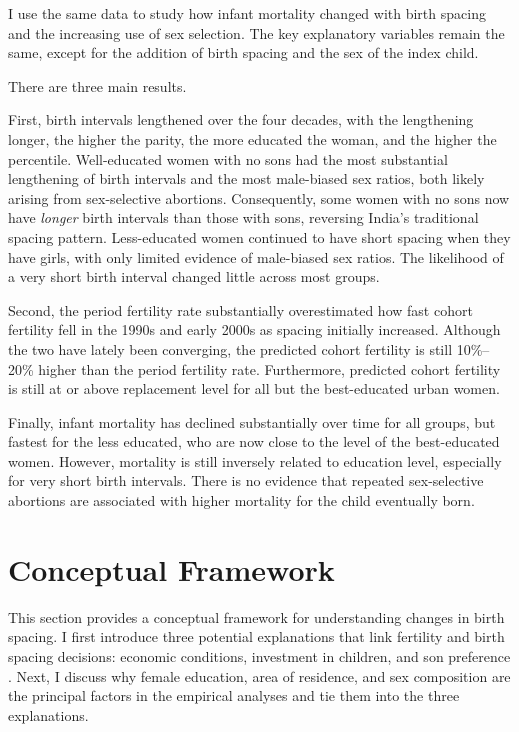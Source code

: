 \documentclass[12pt,letterpaper]{article}
\begin{document}
I use the same data to study how infant mortality changed with birth spacing and 
the increasing use of sex selection. 
The key explanatory variables remain the same, except for the addition of birth spacing 
and the sex of the index child. 

There are three main results.


First, birth intervals lengthened over the four decades, with the lengthening longer, the
higher the parity, the more educated the woman, and the higher the percentile.
Well-educated women with no sons had the most substantial lengthening of birth intervals 
and the most male-biased sex ratios, both likely arising from sex-selective abortions. 
Consequently, some women with no sons now have \emph{longer} birth intervals than those 
with sons, reversing India's traditional spacing pattern. 
Less-educated women continued to have short spacing when they have girls, with only limited 
evidence of male-biased sex ratios.
The likelihood of a very short birth interval changed little across most groups. 

Second, the period fertility rate substantially overestimated how fast cohort fertility 
fell in the 1990s and early 2000s as spacing initially increased. 
Although the two have lately been converging, the predicted cohort fertility is still 
10\%--20\% higher than the period fertility rate. 
Furthermore, predicted cohort fertility is still at or above replacement level for all but 
the best-educated urban women. 

Finally, infant mortality has declined substantially over time for all groups, but fastest 
for the less educated, who are now close to the level of the best-educated women. 
However, mortality is still inversely related to education level, especially for very short 
birth intervals. 
There is no evidence that repeated sex-selective abortions are associated with higher 
mortality for the child eventually born.


\section{Conceptual Framework}

This section provides a conceptual framework for understanding changes in birth spacing.
I first introduce three potential explanations that link fertility and birth 
spacing decisions: economic conditions, investment in children, and son preference 
\citep{Casterline2016,Portner2018}.
Next, I discuss why female education, area of residence, and sex composition are the
principal factors in the empirical analyses and tie them into the three explanations.
\end{document}
